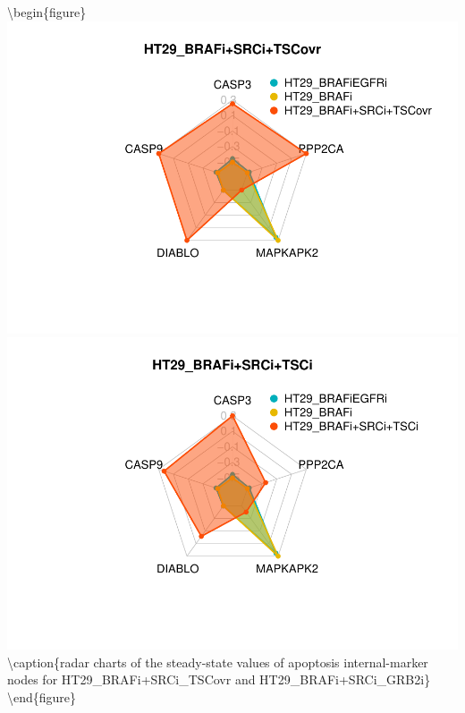 \documentclass[
]{book}
\begin{document}
\textbackslash begin\{figure\}
\includegraphics[width=0.5\linewidth]{_main_files/figure-latex/crc-chartsapop-1} \includegraphics[width=0.5\linewidth]{_main_files/figure-latex/crc-chartsapop-2} \textbackslash caption\{radar charts of the steady-state values of apoptosis internal-marker nodes for HT29\_BRAFi+SRCi\_TSCovr and HT29\_BRAFi+SRCi\_GRB2i\}\label{fig:crc-chartsapop}
\textbackslash end\{figure\}
\end{document}
